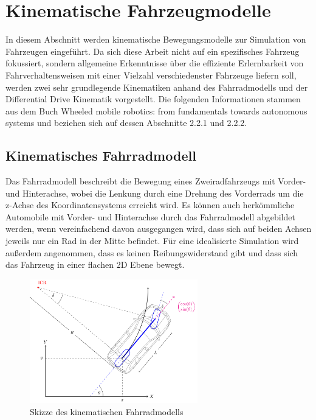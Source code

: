 
\section{Kinematische Fahrzeugmodelle}\label{sec:VehicleKinematics}

In diesem Abschnitt werden kinematische Bewegungsmodelle zur Simulation von Fahrzeugen
eingeführt. Da sich diese Arbeit nicht auf ein spezifisches Fahrzeug fokussiert,
sondern allgemeine Erkenntnisse über die effiziente Erlernbarkeit von Fahrverhaltensweisen
mit einer Vielzahl verschiedenster Fahrzeuge liefern soll, werden zwei sehr
grundlegende Kinematiken anhand des Fahrradmodells und der Differential Drive Kinematik
vorgestellt. Die folgenden Informationen stammen aus dem Buch
\glqq{}Wheeled mobile robotics: from fundamentals towards autonomous systems\grqq{} \cite{klancar_2017_motion} und beziehen sich auf dessen Abschnitte 2.2.1 und 2.2.2.

\subsection{Kinematisches Fahrradmodell}\label{sec:Bicycle}
Das Fahrradmodell beschreibt die Bewegung eines Zweiradfahrzeugs mit Vorder-
und Hinterachse, wobei die Lenkung durch eine Drehung des Vorderrads um die z-Achse
des Koordinatensystems erreicht wird. Es können auch herkömmliche Automobile mit
Vorder- und Hinterachse durch das Fahrradmodell abgebildet werden, wenn vereinfachend davon
ausgegangen wird, dass sich auf beiden Achsen jeweils nur ein Rad in der Mitte befindet.
Für eine idealisierte Simulation wird außerdem angenommen, dass es keinen
Reibungswiderstand gibt und dass sich das Fahrzeug in einer flachen 2D Ebene bewegt.\\

\begin{figure}[h]
  \centering
  \includegraphics[width = 0.65\textwidth]{imgs/bicycle_model}
  \caption{Skizze des kinematischen Fahrradmodells \cite{fermi2023bicycleimg}}
  \label{img:BicycleDrive}
\end{figure}

